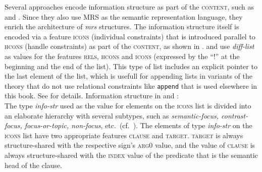 \documentclass[output=paper,biblatex,babelshorthands,newtxmath,draftmode,colorlinks,citecolor=brown]{langscibook}
\begin{document}
Several approaches encode information structure as part of the \textsc{content},
such as  and . Since they also
use MRS as the semantic representation language, they enrich the
architecture of \textit{mrs} structures. The information structure
itself is encoded via a feature  \textsc{icons} (individual
constraints) that is introduced parallel to  \textsc{hcons} (handle
constraints) as part of the \textsc{content}, as shown in
. \citet{song2018} and \citet{song-bender:2012}
use \textit{diff-list} as values for the features \textsc{rels}, \textsc{hcons}
and \textsc{icons} (expressed by the ``!'' at the beginning and the
end of the list). This type of list includes an explicit pointer
to the last element of the list, which is usefull for appending lists in variants of
the theory that do not use relational constraints like \texttt{append} that is used elsewhere in this book. See  for details.
\ea\label{fig:song-infostruc}
Information structure in  and :\\
\z
The type  \textit{info-str} used as the value for elements on the
\textsc{icons} list is divided into an elaborate hierarchy with
several subtypes, such as \textit{semantic-focus, contrast-focus,
  focus-or-topic, non-focus}, etc.\ (cf.~\citealt[114]{song2018}). The
elements of type \textit{info-str} on the \textsc{icons} list have two
appropriate features \textsc{clause} and \textsc{target}. \textsc{target} is
always structure-shared with the respective sign's \textsc{arg0} value, and
the value of \textsc{clause} is always structure-shared with the
\textsc{index} value of the predicate that is the semantic head of the
clause.
\end{document}
